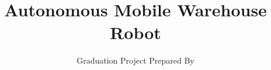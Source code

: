 \usepackage[english]{babel} %
\usepackage{elysium}

\renewcommand{\thesispartlabelfont}{\color{ctcolorpartnum}\fontsize{60}{60}\normalfont}
\renewcommand{\thesispartfont}{\color{ctcolorparttext}\normalfont\huge\bfseries}
\renewcommand{\thesischapterfont}{\color{ctcolorblack}\normalfont\huge\bfseries}
\renewcommand{\thesissectionfont}{\color{ctcolorsection}\normalfont\LARGE}
\renewcommand{\thesissubsectionfont}{\color{ctcolorsubsection}\normalfont\Large}
\renewcommand{\thesisparagraphfont}{\color{ctcolorparagraph}\normalfont\small\bfseries}
\renewcommand{\ctfontfooterpagenumber}{\color{ctcolorfooterpage}\normalfont\normalsize\bfseries}
\renewcommand{\ctfontfootertext}{\color{ctcolorfootertitle}\normalfont\footnotesize}


\usepackage{scrhack}

\usepackage{pdfpages}

\title{Autonomous Mobile Warehouse Robot}
\subtitle{Graduation Project Prepared By}

\usepackage{geometry}

\setlength{\footheight}{20pt}
\setlength{\footskip}{60pt}


